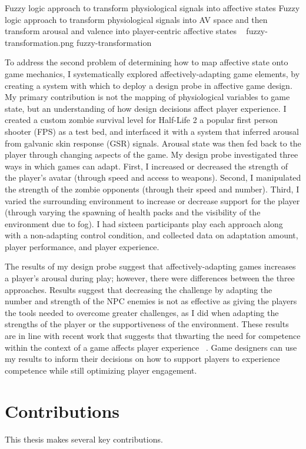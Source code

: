 \largeimg
{Fuzzy logic approach to transform physiological signals into affective states}
{Fuzzy logic approach to transform physiological signals into AV space and then transform arousal and valence into player-centric affective states ~\cite{mandryk2007fuzzy}}
{fuzzy-transformation.png}
{fuzzy-transformation}

To address the second problem of determining how to map affective state onto game mechanics, I systematically explored affectively-adapting game elements, by creating a system with which to deploy a design probe in affective game design. My primary contribution is not the mapping of physiological variables to game state, but an understanding of how design decisions affect player experience. I created a custom zombie survival level for Half-Life 2 a popular first person shooter (FPS) as a test bed, and interfaced it with a system that inferred arousal from galvanic skin response (GSR) signals. Arousal state was then fed back to the player through changing aspects of the game. My design probe investigated three ways in which games can adapt. First, I increased or decreased the strength of the player's avatar (through speed and access to weapons). Second, I manipulated the strength of the zombie opponents (through their speed and number). Third, I varied the surrounding environment to increase or decrease support for the player (through varying the spawning of health packs and the visibility of the environment due to fog). I had sixteen participants play each approach along with a non-adapting control condition, and collected data on adaptation amount, player performance, and player experience.

The results of my design probe suggest that affectively-adapting games increases a player's arousal during play; however, there were differences between the three approaches. Results suggest that decreasing the challenge by adapting the number and strength of the NPC enemies is not as effective as giving the players the tools needed to overcome greater challenges, as I did when adapting the strengths of the player or the supportiveness of the environment. These results are in line with recent work that suggests that thwarting the need for competence within the context of a game affects player experience ~\cite{przybylski2013competence}. Game designers can use my results to inform their decisions on how to support players to experience competence while still optimizing player engagement.

\section{Contributions}
This thesis makes several key contributions.

